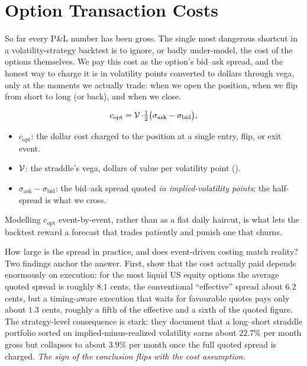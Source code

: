 \section{Option Transaction Costs}
\label{sec:ivrv:option-costs}

So far every P\&L number has been gross. The single most dangerous shortcut in a volatility-strategy backtest is to ignore, or badly under-model, the cost of the options themselves. We pay this cost as the option's bid--ask spread, and the honest way to charge it is in volatility points converted to dollars through vega, only at the moments we actually trade: when we open the position, when we flip from short to long (or back), and when we close.

\begin{equation}
\label{eq:ivrv:vega-cost}
c_{\text{opt}} = \operatorname{\mathcal{V}} \cdot \tfrac{1}{2}\big(\sigma_{\text{ask}} - \sigma_{\text{bid}}\big),
\end{equation}
\begin{itemize}
  \item $c_{\text{opt}}$: the dollar cost charged to the position at a single entry, flip, or exit event.
  \item $\operatorname{\mathcal{V}}$: the straddle's vega, dollars of value per volatility point ().
  \item $\sigma_{\text{ask}} - \sigma_{\text{bid}}$: the bid--ask spread quoted \emph{in implied-volatility points}; the half-spread is what we cross.
\end{itemize}

\begin{projectconnection}
Modelling $c_{\text{opt}}$ event-by-event, rather than as a flat daily haircut, is what lets the backtest reward a forecast that trades patiently and punish one that churns.
\end{projectconnection}

How large is the spread in practice, and does event-driven costing match reality? Two findings anchor the answer. First, \citet{MuravyevPearson2020} show that the cost actually paid depends enormously on execution: for the most liquid US equity options the average quoted spread is roughly $8.1$ cents, the conventional ``effective'' spread about $6.2$ cents, but a timing-aware execution that waits for favourable quotes pays only about $1.3$ cents, roughly a fifth of the effective and a sixth of the quoted figure. The strategy-level consequence is stark: they document that a long--short straddle portfolio sorted on implied-minus-realized volatility earns about $22.7\%$ per month gross but collapses to about $3.9\%$ per month once the full quoted spread is charged. \emph{The sign of the conclusion flips with the cost assumption.}

